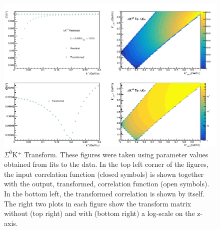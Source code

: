\documentclass[../AnalysisNoteJBuxton.tex]{subfiles}
\begin{document}
\begin{figure}[h]
  \centering
  \includegraphics[width=\textwidth]{5_Fitting/Figures/Residuals_LamKchP_0010_LamKSt0_MomResCrctn_NonFlatBgdCrctn_10Res_PrimMaxDecay4fm_UsingXiDataAndCoulombOnly.pdf}
  \caption[$\Sigma^{0}$K$^{+}$ Transform]{$\Sigma^{0}$K$^{+}$ Transform.  These figures were taken using parameter values obtained from fits to the data.  In the top left corner of the figures, the input correlation function (closed symbols) is shown together with the output, transformed, correlation function (open symbols).  In the bottom left, the transformed correlation is shown by itself.  The right two plots in each figure show the transform matrix without (top right) and with (bottom right) a log-scale on the z-axis.}
  \label{fig:LamKSt0toLamKchPTransform}
\end{figure}
\end{document}
